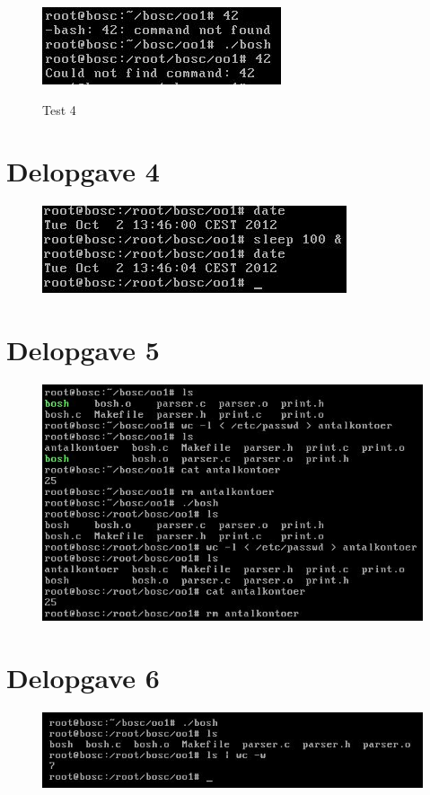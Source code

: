 \begin{figure}[!ht]
\centering
\caption{Test 4}
\includegraphics{Images/TestOfPart3_4}
\label{Test3_4}
\end{figure}

\clearpage
\section{Delopgave 4}
\begin{figure}[!h]
\centering
\includegraphics{Images/TestOfPart4}
\label{Test4}
\end{figure}

\section{Delopgave 5}
\begin{figure}[!h]
\centering
\includegraphics{Images/TestOfPart5}
\label{Test5}
\end{figure}

\section{Delopgave 6}
\begin{figure}[!h]
\centering
\includegraphics{Images/TestOfPart6}
\label{Test6}
\end{figure}

